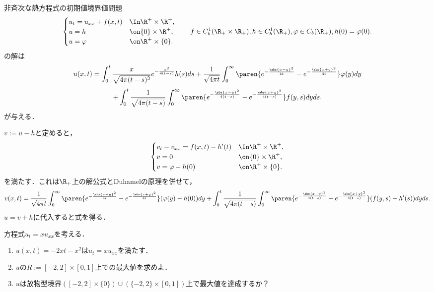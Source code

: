 \documentclass[uplatex,dvipdfmx]{jsarticle}
\begin{document}
\begin{problem}
    非斉次な熱方程式の初期値境界値問題
    \[\begin{cases}
        u_t=u_{xx}+f(x,t)&\In\R^+\times\R^+,\\
        u=h&\on\{0\}\times\R^+,\\
        u=\varphi&\on\R^+\times\{0\}.
    \end{cases}\qquad f\in C^1_b(\R_+\times\R_+),h\in C^1_b(\R_+),\varphi\in C_b(\R_+),h(0)=\varphi(0).\]
    の解は
    \[u(x,t)=\int^t_0\frac{x}{\sqrt{4\pi(t-s)^3}}e^{-\frac{x^2}{4(t-s)}}h(s)ds+\frac{1}{\sqrt{4\pi t}}\int^\infty_0\paren{e^{-\frac{\abs{x-y}^2}{4t}}-e^{-\frac{\abs{x+y}^2}{4t}}}\varphi(y)dy\]
    \[+\int^t_0\frac{1}{\sqrt{4\pi(t-s)}}\int^\infty_0\paren{e^{-\frac{\abs{x-y}^2}{4(t-s)}}-e^{-\frac{\abs{x+y}^2}{4(t-s)}}}f(y,s)dyds.\]
    が与える．
\end{problem}
\begin{Proof}[\underline{\bf【解】}]
    $v:=u-h$と定めると，
    \[\begin{cases}
        v_t-v_{xx}=f(x,t)-h'(t)&\In\R^+\times\R^+,\\
        v=0&\on\{0\}\times\R^+,\\
        v=\varphi-h(0)&\on\R^+\times\{0\}.
    \end{cases}\]
    を満たす．これは$\R_+$上の解公式とDuhamelの原理を併せて，
    \[v(x,t)=\frac{1}{\sqrt{4\pi t}}\int^\infty_0\paren{e^{-\frac{\abs{x-y}^2}{4t}}-e^{-\frac{\abs{x+y}^2}{4t}}}(\varphi(y)-h(0))dy+\int^t_0\frac{1}{\sqrt{4\pi(t-s)}}\int^\infty_0\paren{e^{-\frac{\abs{x-y}^2}{4(t-s)}}-e^{-\frac{\abs{x+y}^2}{4(t-s)}}}(f(y,s)-h'(s))dyds.\]
    $u=v+h$に代入すると式を得る．
\end{Proof}

\begin{problem}
    方程式$u_t=xu_{xx}$を考える．
    \begin{enumerate}
        \item $u(x,t)=-2xt-x^2$は$u_t=xu_{xx}$を満たす．
        \item $u$の$R:=[-2,2]\times[0,1]$上での最大値を求めよ．
        \item $u$は放物型境界$([-2,2]\times\{0\})\cup(\{-2,2\}\times[0,1])$上で最大値を達成するか？
    \end{enumerate}
\end{problem}
\begin{Proof}[\underline{\bf【解】}]
    
\end{Proof}
\end{document}
